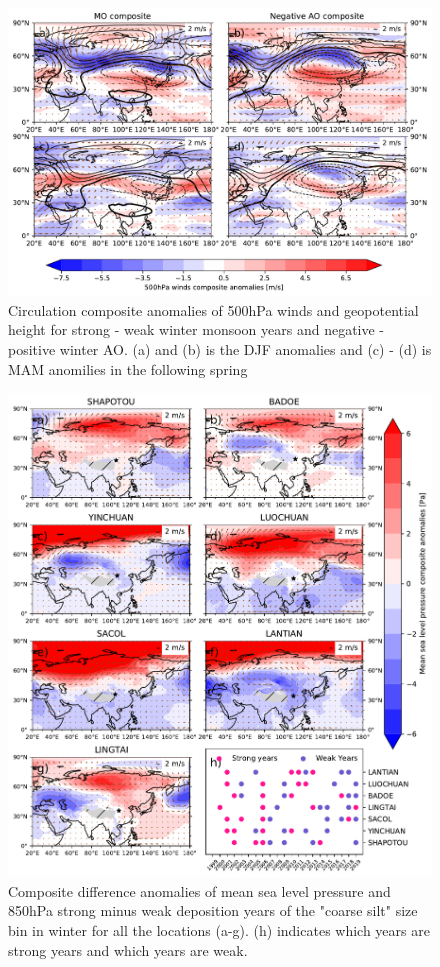\begin{figure}
    \centering
    \includegraphics[width=\textwidth]{texfiles/figs/winter_MO_AO_composite_500h.pdf}
    \caption{Circulation composite anomalies of 500hPa winds and geopotential height for strong - weak winter monsoon years and negative - positive winter AO. (a) and (b) is the DJF anomalies and (c) - (d) is MAM anomilies in the following spring}
    \label{fig:mo_ao_composite_500hPa}
\end{figure}

\begin{figure}[hp]
    \centering
    \includegraphics[width=\textwidth]{texfiles/figs/mslp_850hPa_20micron_DJF.pdf}
    \caption{Composite difference anomalies of mean sea level pressure and 850hPa strong minus weak deposition years of the "coarse silt" size bin in winter for all the locations (a-g).  (h) indicates which years are strong years and which years are weak.}
    \label{fig:DJF_850_coarse_composite}
\end{figure}

